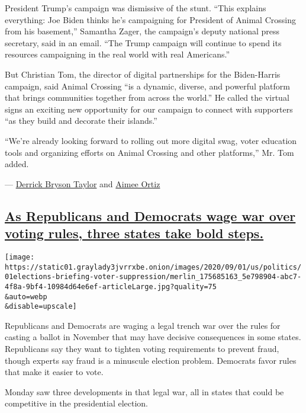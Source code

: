 President Trump's campaign was dismissive of the stunt. ``This explains
everything: Joe Biden thinks he's campaigning for President of Animal
Crossing from his basement,'' Samantha Zager, the campaign's deputy
national press secretary, said in an email. ``The Trump campaign will
continue to spend its resources campaigning in the real world with real
Americans.''

But Christian Tom, the director of digital partnerships for the
Biden-Harris campaign, said Animal Crossing ``is a dynamic, diverse, and
powerful platform that brings communities together from across the
world.'' He called the virtual signs an exciting new opportunity for our
campaign to connect with supporters ``as they build and decorate their
islands.''

``We're already looking forward to rolling out more digital swag, voter
education tools and organizing efforts on Animal Crossing and other
platforms,'' Mr. Tom added.

---
\href{https://www.nytimes3xbfgragh.onion/by/derrick-bryson-taylor}{Derrick
Bryson Taylor} and
\href{https://www.nytimes3xbfgragh.onion/by/aimee-ortiz}{Aimee Ortiz}

\hypertarget{as-republicans-and-democrats-wage-war-over-voting-rules-three-states-take-bold-steps}{%
\subsection{\texorpdfstring{\protect\hyperlink{as-republicans-and-democrats-wage-war-over-voting-rules-three-states-take-bold-steps}{As
Republicans and Democrats wage war over voting rules, three states take
bold
steps.}}{As Republicans and Democrats wage war over voting rules, three states take bold steps.}}\label{as-republicans-and-democrats-wage-war-over-voting-rules-three-states-take-bold-steps}}

\texttt{[image: https://static01.graylady3jvrrxbe.onion/images/2020/09/01/us/politics/01elections-briefing-voter-suppression/merlin\_175685163\_5e798904-abc7-4f8a-9bf4-10984d64e6ef-articleLarge.jpg?quality=75\\\&auto=webp\\\&disable=upscale]}

Republicans and Democrats are waging a legal trench war over the rules
for casting a ballot in November that may have decisive consequences in
some states. Republicans say they want to tighten voting requirements to
prevent fraud, though experts say fraud is a minuscule election problem.
Democrats favor rules that make it easier to vote.

Monday saw three developments in that legal war, all in states that
could be competitive in the presidential election.

